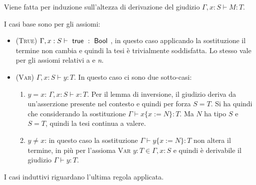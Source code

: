 Viene fatta per induzione sull'altezza di derivazione del giudizio $\Gamma , x : S \vdash M : T$.

I casi base sono per gli assiomi:

\begin{itemize}
	\item \textsc{(True)} $\Gamma , x : S \vdash \true : \Bool$, in questo caso applicando la sostituzione il termine  non cambia e quindi la tesi è trivialmente soddisfatta. Lo stesso vale per gli assiomi relativi a  e \textit{n}.
	\item \textsc{(Var)} $\Gamma , x : S \vdash y : T$. In questo caso ci sono due sotto-casi:
	\begin{enumerate}[a]
		\item $y = x$:  $\Gamma , x : S \vdash x : T$. Per il lemma di inversione, il giudizio deriva da un'asserzione presente nel contesto e quindi per forza $S = T$. Si ha quindi che considerando la sostituzione $\Gamma \vdash x\{x:=N\}:T $. Ma $N$ ha tipo $S$ e $S = T$, quindi la tesi continua a valere.
		\item $y \neq x$: in questo caso la sostituzione $\Gamma \vdash y\{x:=N\}:T $ non altera il termine, in più per l'assioma \textsc{Var} $y : T \in \Gamma, x :S$ e quindi è derivabile il giudizio $\Gamma \vdash y :T$.
	\end{enumerate}
\end{itemize}

\noindent I casi induttivi riguardano l'ultima regola applicata.

